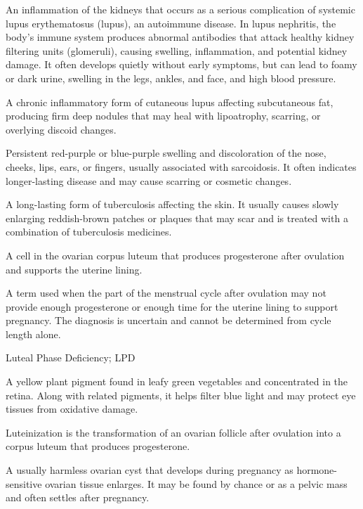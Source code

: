  An inflammation of the kidneys that occurs as a serious complication of systemic lupus erythematosus (lupus), an autoimmune disease. In lupus nephritis, the body's immune system produces abnormal antibodies that attack healthy kidney filtering units (glomeruli), causing swelling, inflammation, and potential kidney damage. It often develops quietly without early symptoms, but can lead to foamy or dark urine, swelling in the legs, ankles, and face, and high blood pressure.

 A chronic inflammatory form of cutaneous lupus affecting subcutaneous fat, producing firm deep nodules that may heal with lipoatrophy, scarring, or overlying discoid changes.

 Persistent red-purple or blue-purple swelling and discoloration of the nose, cheeks, lips, ears, or fingers, usually associated with sarcoidosis. It often indicates longer-lasting disease and may cause scarring or cosmetic changes.

 A long-lasting form of tuberculosis affecting the skin. It usually causes slowly enlarging reddish-brown patches or plaques that may scar and is treated with a combination of tuberculosis medicines.

 A cell in the ovarian corpus luteum that produces progesterone after ovulation and supports the uterine lining.

 A term used when the part of the menstrual cycle after ovulation may not provide enough progesterone or enough time for the uterine lining to support pregnancy. The diagnosis is uncertain and cannot be determined from cycle length alone.

\synonyms
Luteal Phase Deficiency; LPD

 A yellow plant pigment found in leafy green vegetables and concentrated in the retina. Along with related pigments, it helps filter blue light and may protect eye tissues from oxidative damage.

 Luteinization is the transformation of an ovarian follicle after ovulation into a corpus luteum that produces progesterone.

 A usually harmless ovarian cyst that develops during pregnancy as hormone-sensitive ovarian tissue enlarges. It may be found by chance or as a pelvic mass and often settles after pregnancy.

